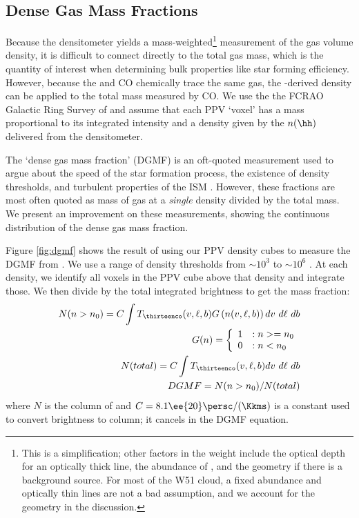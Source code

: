\subsection{Dense Gas Mass Fractions}
Because the \formaldehyde densitometer yields a
mass-weighted\footnote{This is a simplification; other factors in the
weight include the optical depth for an optically thick line, the abundance of
\formaldehyde, and the geometry if there is a background source.  For most of
the W51 cloud, a fixed abundance and optically thin lines are not a bad
assumption, and we account for the geometry in the discussion.}
measurement of
the gas volume density, it is difficult to connect directly to the total gas
mass, which is the quantity of interest when determining bulk properties like
star forming efficiency.  However, because the \formaldehyde and CO chemically
trace the same gas, the \formaldehyde-derived density can be applied to the
total mass measured by CO.   We use the the FCRAO Galactic Ring Survey
of \thirteenco \citep{Jackson2006a} and assume that each \thirteenco PPV
`voxel' has a mass proportional to its integrated intensity and a density given
by the $n(\hh)$ delivered from the \formaldehyde densitometer.

The `dense gas mass fraction' (DGMF) is an oft-quoted measurement used to argue
about the speed of the star formation process, the existence of density
thresholds, and turbulent properties of the ISM \citep[e.g. Fig. 5
of][]{Krumholz2007a,Battisti2014a,Kainulainen2013a,Juneau2009a,Muraoka2009a,Hopkins2013e}.
However, these fractions are most often quoted as mass of gas at a
\emph{single} density divided by the total mass.  We present an improvement on
these measurements, showing the continuous distribution of the dense gas mass
fraction.

Figure \ref{fig:dgmf} shows the result of using our \formaldehyde PPV density
cubes to measure the DGMF from \thirteenco.  We use a range of density
thresholds from $\sim10^3$ to $\sim10^6$ \percc.  At each density, we identify
all voxels in the \thirteenco PPV cube above that density and integrate those.
We then divide by the total integrated \thirteenco brightness to get the mass
fraction: 
\begin{eqnarray}
    N(n>n_0) =  C \int T_{\thirteenco}(v,\ell,b) 
                G\left(n(v,\ell,b)\right) dv~d\ell~db \\
    G(n) = \left\{ \begin{array}{ll}
        1 & : n >= n_0 \\
        0 & : n < n_0 \\
    \end{array} \right.\\
    N(total) = C \int T_{\thirteenco}(v, \ell, b) dv~d\ell~db\\
    DGMF = N(n>n_0) / N(total)
\end{eqnarray}
where $N$ is the column of \hh and $C=8.1\ee{20} \persc /
(\Kkms)$ is a constant used to convert \thirteenco brightness to
\hh column; it cancels in the DGMF equation.



